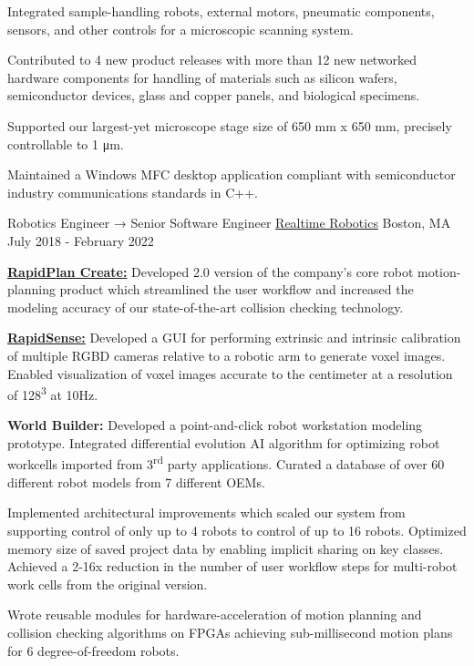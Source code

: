 \begin{cventries}
{\begin{cvitems}
        \item{Integrated sample-handling robots, external motors, pneumatic components, sensors, and other controls for a microscopic scanning system.}
        \item{Contributed to 4 new product releases with more than 12 new networked hardware components for handling of materials such as silicon wafers, semiconductor devices, glass and copper panels, and biological specimens.}
        \item{Supported our largest-yet microscope stage size of 650 mm x 650 mm, precisely controllable to 1 μm.}
        \item{Maintained a Windows MFC desktop application compliant with semiconductor industry communications standards in C++.}
      \end{cvitems}
    }
    \cventry
    {Robotics Engineer → Senior Software Engineer}
    {\href{https://rtr.ai/}{Realtime Robotics}}
    {Boston, MA}
    {July 2018 - February 2022}
    {
    \begin{cvitems}
        \item{\textbf{\href{https://rtr.ai/solutions/rapidplan/}{RapidPlan Create:}} Developed 2.0 version of the company's core robot motion-planning product which streamlined the user workflow and increased the modeling accuracy of our state-of-the-art collision checking technology.}
        \item{\textbf{\href{https://rtr.ai/solutions/rapidsense/}{RapidSense:}} Developed a GUI for performing extrinsic and intrinsic calibration of multiple RGBD cameras relative to a robotic arm to generate voxel images. Enabled visualization of voxel images accurate to the centimeter at a resolution of 128\textsuperscript{3} at 10Hz.}
        \item{\textbf{World Builder:} Developed a point-and-click robot workstation modeling prototype. Integrated differential evolution AI algorithm for optimizing robot workcells imported from 3\textsuperscript{rd} party applications. Curated a database of over 60 different robot models from 7 different OEMs.}
        \item{Implemented architectural improvements which scaled our system from supporting control of only up to 4 robots to control of up to 16 robots. Optimized memory size of saved project data by enabling implicit sharing on key classes. Achieved a 2-16x reduction in the number of user workflow steps for multi-robot work cells from the original version.}
        \item{Wrote reusable modules for hardware-acceleration of motion planning and collision checking algorithms on FPGAs achieving sub-millisecond motion plans for 6 degree-of-freedom robots.}

\end{cvitems}}
\end{cventries}
